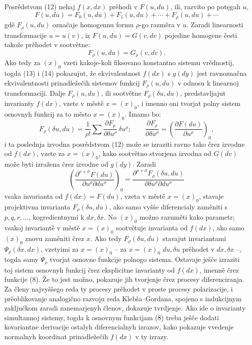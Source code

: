 \documentclass[11pt]{article}
\begin{document}
Posrědstvom (12) nehaj \(f(x,dx)\) prěhodi v \(F(u,du)\), ili, razvito po potęgah \(u\),
\begin{equation}
F(u,du)=F_0(u,du)+F_1(u,du)+\cdots+F_\rho(u,du)+\cdots
\tag{13}
\end{equation}
gdě \(F_\rho(u,du)\) označaje homogennu formu \(\rho\)-go razměra v \(u\). Zaradi linearnosti transformacije \(u=u(v)\), iz \(F(u,du)=G(v,dv)\) pojedine homogene česti takože prěhodet v sootvětne:
\begin{equation}
F_\rho(u,du)=G_\rho(v,dv).
\tag{14}
\end{equation}
Ako tedy za \((x)_0\) vzeti kakoje-koli fiksovano konstantno sistemu vrědnostij, togda (13) i (14) pokazujut, že ekvivalentnost \(f(dx)\) s \(g(dy)\) jest ravnoznačna ekvivalentnosti prinadležečih sistemov funkcij \(F_\rho(u,du)\) v odnosu k linearnoj transformaciji. Dalje \(F_\rho(u,du)\), ili sootvětne \(F_\rho(\delta u,du)\), predstavljajut invarianty \(f(dx)\), vzete v městě \(x=(x)_0\), i imenno oni tvorjat polny sistem osnovnyh funkcij za to město \(x=(x)_0\). Imamo bo:
\[
F_\rho(\delta u,du)=\frac1{\rho!}\sum
\frac{\partial F_\rho}{\partial \delta u^\rho}\,\delta u^\rho;
\qquad
\frac{\partial F_\rho}{\partial \delta u^\rho}
=\left(\frac{\partial F(du)}{\partial u^\rho}\right)_0,
\]
i ta poslednja izvodna posrědstvom (12) može se izraziti ravno tako črez izvodne od \(f(dx)\), vzete za \(x=(x)_0\), kako sootvětno stvorjena izvodna od \(G(dv)\) može byti izražena črez izvodne od \(g(dy)\). Zaradi
\[
\left(\frac{\partial^{\rho+\sigma}F(du)}
{\partial u^\rho\partial du^\sigma}\right)_0
=
\frac{\partial^{\rho+\sigma}F_\rho(\delta u,du)}
{\partial\delta u^\rho\partial du^\sigma}
\]
vsaka invarianta od \(f(dx)=F(du)\), vzeta v městě \(x=(x)_0\), stavaje projektivna invarianta \(F_\rho(\delta u,du)\), ako samo vyšše diferencialy zaměniti s \(p,q,r,\ldots\), kogredientnymi k \(dx,\delta x\). No \((x)_0\) možno razuměti kako parametr; vsakoj invariantě v městě \(x=(x)_0\) sootvětuje invarianta od \(f(dx)\), ako samo \((x)_0\) znovu zaměniti črez \(x\). Ako tedy \(F_\rho(\delta u,du)\) stavajut invariantami \(\Psi_\rho(\delta x,dx)\), vzetyimi za \(x=(x)_0\) -- za \(x=(x)_0\) \(du,\delta u\) prěhodet v \(dx,\delta x\) --, togda samy \(\Psi_\rho\) tvorjat osnovne funkcije polnogo sistema. Ostavaje ješče izraziti toj sistem osnovnyh funkcij črez eksplicitne invarianty od \(f(dx)\), imenně črez funkcije (8). Že to jest možno, pokazuje jih tvorjenje črez procesy diferenciranja. Za členy najvyššego reda ty procesy prěhodet v proste procesy polarizacije, i prěoblikovanje analogično razvoju reda Klebša--Gordana, spojeno s indukcijnym zaključkom zaradi zanemarjenyh členov, dokazuje tvrdjenje. Ako ide o invarianty simultannoj sistemy, togda k osnovnym funkcijam (8) treba ješče dodati kovariantne derivacije ostalyh diferencialnyh izrazov, kako pokazuje vvedenje normalnyh koordinat prinadležečih \(f(dx)\) v ty izrazy.
\end{document}
